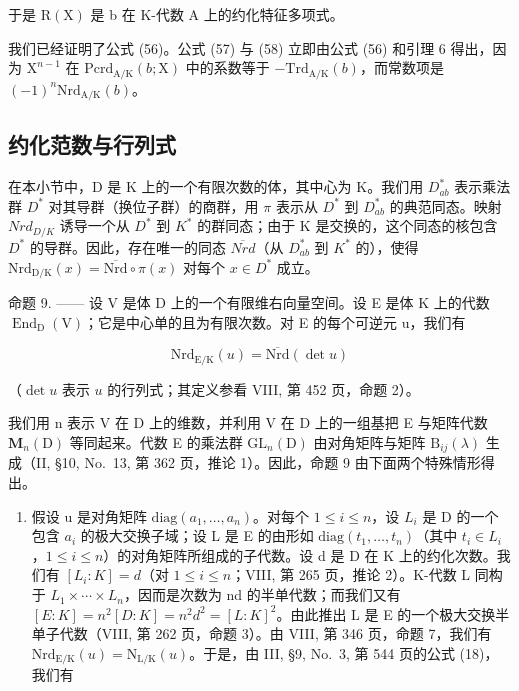 于是 \(\mathrm{R}(\mathrm{X})\) 是 b 在 K-代数 A 上的约化特征多项式。

我们已经证明了公式 (56)。公式 (57) 与 (58) 立即由公式 (56) 和引理 6 得出，因为 \(\mathrm{X}^{n - 1}\) 在 \(\mathrm{Pcrd}_{\mathrm{A / K}}(b;\mathrm{X})\) 中的系数等于 \(-\mathrm{Trd}_{\mathrm{A / K}}(b)\)，而常数项是 \((-1)^n\mathrm{Nrd}_{\mathrm{A / K}}(b)\)。

\subsection{约化范数与行列式}

在本小节中，D 是 K 上的一个有限次数的体，其中心为 K。我们用 \(D_{ab}^{*}\) 表示乘法群 \(D^{*}\) 对其导群（换位子群）的商群，用 \(\pi\) 表示从 \(D^{*}\) 到 \(D_{ab}^{*}\) 的典范同态。映射 \(Nrd_{D/K}\) 诱导一个从 \(D^{*}\) 到 \(K^{*}\) 的群同态；由于 K 是交换的，这个同态的核包含 \(D^{*}\) 的导群。因此，存在唯一的同态 \(\overline{Nrd}\)（从 \(D_{ab}^{*}\) 到 \(K^{*}\) 的），使得 \(\mathrm{Nrd}_{\mathrm{D/K}}(x)=\overline{\mathrm{Nrd}}\circ\pi(x)\) 对每个 \(x\in D^{*}\) 成立。

命题 9. —— 设 V 是体 D 上的一个有限维右向量空间。设 E 是体 K 上的代数 \(\operatorname{End}_{\mathrm{D}}(\mathrm{V})\)；它是中心单的且为有限次数。对 E 的每个可逆元 u，我们有

\[
\mathrm{Nrd} _ {\mathrm{E/K}} (u) = \overline {{\mathrm{Nrd}}} (\det u)\tag{64}
\]

（\(\det u\) 表示 \(u\) 的行列式；其定义参看 VIII, 第 452 页，命题 2）。

我们用 n 表示 V 在 D 上的维数，并利用 V 在 D 上的一组基把 E 与矩阵代数 \(\mathbf{M}_{n}(\mathrm{D})\) 等同起来。代数 E 的乘法群 \(\mathrm{GL}_{n}(\mathrm{D})\) 由对角矩阵与矩阵 \(\mathrm{B}_{ij}(\lambda)\) 生成（II, §10, No.~13, 第 362 页，推论 1）。因此，命题 9 由下面两个特殊情形得出。

\begin{enumerate}
\def\labelenumi{\Alph{enumi})}
\tightlist
\item
  假设 u 是对角矩阵 \(\mathrm{diag}(a_{1},\ldots,a_{n})\)。对每个 \(1\leqslant i\leqslant n\)，设 \(L_{i}\) 是 D 的一个包含 \(a_{i}\) 的极大交换子域；设 L 是 E 的由形如 \(\mathrm{diag}(t_{1},\ldots,t_{n})\)（其中 \(t_{i}\in L_{i}\)，\(1\leqslant i\leqslant n\)）的对角矩阵所组成的子代数。设 d 是 D 在 K 上的约化次数。我们有 \([L_{i}:K]=d\)（对 \(1\leqslant i\leqslant n\)；VIII, 第 265 页，推论 2）。K-代数 L 同构于 \(L_{1}\times\cdots\times L_{n}\)，因而是次数为 nd 的半单代数；而我们又有 \([E:K]=n^{2}[D:K]=n^{2}d^{2}=[L:K]^{2}\)。由此推出 L 是 E 的一个极大交换半单子代数（VIII, 第 262 页，命题 3）。由 VIII, 第 346 页，命题 7，我们有 \(\mathrm{Nrd}_{\mathrm{E}/\mathrm{K}}(u)=\mathrm{N}_{\mathrm{L}/\mathrm{K}}(u)\)。于是，由 III, §9, No.~3, 第 544 页的公式 (18)，我们有
\end{enumerate}


